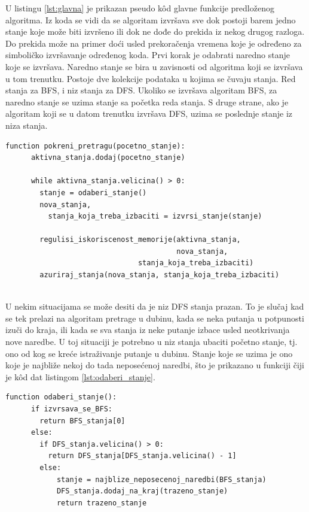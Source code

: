 \documentclass[12pt,oneside]{memoir}
\begin{document}
U listingu \ref{lst:glavna} je prikazan pseudo k\^od glavne funkcije predloženog algoritma. Iz koda se vidi da se algoritam izvršava sve dok postoji barem jedno stanje koje može biti izvršeno ili dok ne dođe do prekida iz nekog drugog razloga. Do prekida može na primer doći usled prekoračenja vremena koje je određeno za simboličko izvršavanje određenog koda. Prvi korak je odabrati naredno stanje koje se izvršava. Naredno stanje se bira u zavisnosti od algoritma koji se izvršava u tom trenutku. Postoje dve kolekcije podataka u kojima se čuvaju stanja. Red stanja za BFS, i niz stanja za DFS. Ukoliko se izvršava algoritam BFS, za naredno stanje se uzima stanje sa početka reda stanja. S druge strane, ako je algoritam koji se u datom trenutku izvršava DFS, uzima se poslednje stanje iz niza stanja. 

  \begin{lstlisting}[caption={Pseudokod glavne funckije algoritma},captionpos=b,label={lst:glavna}]
    function pokreni_pretragu(pocetno_stanje):
      aktivna_stanja.dodaj(pocetno_stanje)
            
      while aktivna_stanja.velicina() > 0:
        stanje = odaberi_stanje()
        nova_stanja, 
          stanja_koja_treba_izbaciti = izvrsi_stanje(stanje)
                
        regulisi_iskoriscenost_memorije(aktivna_stanja, 
                                        nova_stanja,
                               stanja_koja_treba_izbaciti)
        azuriraj_stanja(nova_stanja, stanja_koja_treba_izbaciti)
            
    \end{lstlisting}

U nekim situacijama se može desiti da je niz DFS stanja prazan. To je slučaj kad se tek prelazi na algoritam pretrage u dubinu, kada se neka putanja u potpunosti izuči do kraja, ili kada se sva stanja iz neke putanje izbace usled neotkrivanja nove naredbe. U toj situaciji je potrebno u niz stanja ubaciti početno stanje, tj. ono od kog se kreće istraživanje putanje u dubinu. Stanje koje se uzima je ono koje je najbliže nekoj do tada neposećenoj naredbi, što je prikazano u funkciji čiji je k\^od dat listingom \ref{lst:odaberi_stanje}.

\begin{lstlisting}[caption={Pseudokod funkcije za odabir narednog stanja koje se izvršava},captionpos=b,label={lst:odaberi_stanje}]
    function odaberi_stanje():
      if izvrsava_se_BFS:
        return BFS_stanja[0]
      else:
        if DFS_stanja.velicina() > 0:
          return DFS_stanja[DFS_stanja.velicina() - 1]
        else:
            stanje = najblize_neposecenoj_naredbi(BFS_stanja)
            DFS_stanja.dodaj_na_kraj(trazeno_stanje)
            return trazeno_stanje
    \end{lstlisting}
    
\end{document}
